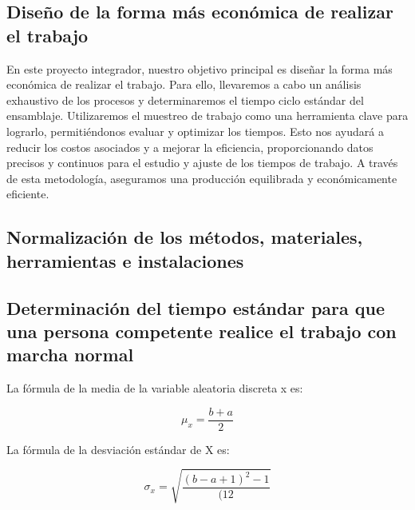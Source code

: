     \subsection{Diseño de la forma más económica de realizar el trabajo}
    En este proyecto integrador, nuestro objetivo principal es diseñar la forma más económica de realizar el trabajo. Para ello, llevaremos a cabo un análisis exhaustivo de los procesos y determinaremos el tiempo ciclo estándar del ensamblaje. Utilizaremos el muestreo de trabajo como una herramienta clave para lograrlo, permitiéndonos evaluar y optimizar los tiempos. Esto nos ayudará a reducir los costos asociados y a mejorar la eficiencia, proporcionando datos precisos y continuos para el estudio y ajuste de los tiempos de trabajo. A través de esta metodología, aseguramos una producción equilibrada y económicamente eficiente.
    \subsection{Normalización de los métodos, materiales, herramientas e instalaciones}
    \subsection{Determinación del tiempo estándar para que una persona competente realice el trabajo con marcha normal}
    La fórmula de la media de la variable aleatoria discreta x es:
    
    \begin{equation}
        \mu_x=\dfrac{b+a}{2}
    \end{equation}
    
    La fórmula de la desviación estándar de X es:
    
    \begin{equation}
    \sigma_x=\sqrt{\dfrac{(b-a+1)^2-1}{(12}}
    \end{equation}
    
    
    
    
